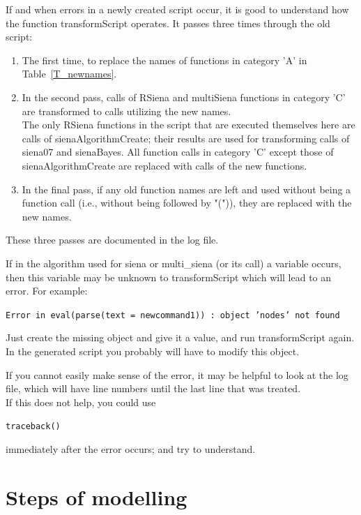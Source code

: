 \documentclass[a4paper,fleqn,11pt]{article}
\newcommand{\+}{\, + \,}
\newcommand{\sfn}[1]{\textsf{#1}}
\newcommand{\RS}{{\sf \textsf{RSiena} }}
\newcommand{\MS}{{\sf multiSiena }}
\begin{document}
\newpage


If and when errors in a newly created script occur,
it is good to understand how the function  \sfn{transformScript}
operates.
It passes three times through the old script:
\begin{enumerate}
  \item The first time, to replace the names of functions in category
    'A' in Table~\ref{T_newnames}.
  \item In the second pass,   calls of \RS and
     \MS functions in category 'C'
     are transformed to calls utilizing the new names.\\
     The only \RS functions in the script
     that are executed themselves here are calls of \sfn{sienaAlgorithmCreate};
     their results are used for transforming
     calls of \sfn{siena07} and \sfn{sienaBayes}.
     All  function calls in category 'C' except those of
      \sfn{sienaAlgorithmCreate} are replaced with
      calls of the new functions.
  \item In the final pass, if any old function names are left and used
     without being a function call (i.e., without being
     followed by "(")), they are replaced with the new names.
\end{enumerate}
These three passes are documented in the log file.


If in the algorithm used for  \sfn{siena} or \sfn{multi\_siena}
(or its call) a variable occurs,
then this variable may be unknown to \sfn{transformScript}
which will lead to an error.
For example:
\medskip

\noindent
\texttt{\small Error in eval(parse(text = newcommand1)) : object 'nodes' not found}
\medskip

\noindent
Just create the missing object and give it a value,
and run \sfn{transformScript}  again.
In the generated script you probably will have to modify this object.

If you cannot easily make sense of the error,
 it may be helpful to look at
the log file, which will have line numbers until the last
line that was treated.\\
If this does not help, you could use
\medskip

\noindent
\texttt{traceback()}
\medskip

\noindent
immediately after the error occurs; and try to understand.

\clearpage

\section{Steps of modelling}
\label{S_parts}
\end{document}
